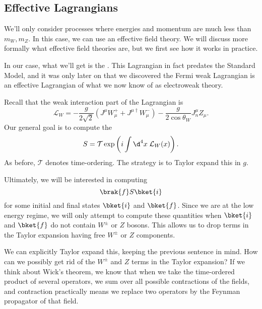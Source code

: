 \documentclass[a4paper]{article}
\begin{document}
\subsection{Effective Lagrangians}
We'll only consider processes where energies and momentum are much less than $m_W, m_Z$. In this case, we can use an effective field theory. We will discuss more formally what effective field theories are, but we first see how it works in practice.

In our case, what we'll get is the . This Lagrangian in fact predates the Standard Model, and it was only later on that we discovered the Fermi weak Lagrangian is an effective Lagrangian of what we now know of as electroweak theory.

Recall that the weak interaction part of the Lagrangian is
\[
  \mathcal{L}_W = -\frac{g}{2\sqrt{2}}(J^\mu W^+_\mu + J^{\mu\dagger}W_\mu^-) - \frac{g}{2 \cos \theta_W} J_n^\mu Z_\mu.
\]
Our general goal is to compute the 
\[
  S = \mathcal{T} \exp\left(i \int \d^4 x\; \mathcal{L}_W(x)\right).
\]
As before, $\mathcal{T}$ denotes time-ordering. The strategy is to Taylor expand this in $g$.

Ultimately, we will be interested in computing
\[
  \brak{f} S\bket{i}
\]
for some initial and final states $\bket{i}$ and $\bket{f}$. Since we are at the low energy regime, we will only attempt to compute these quantities when $\bket{i}$ and $\bket{f}$ do not contain $W^{\pm}$ or $Z$ bosons. This allows us to drop terms in the Taylor expansion having free $W^{\pm}$ or $Z$ components.

We can explicitly Taylor expand this, keeping the previous sentence in mind. How can we possibly get rid of the $W^{\pm}$ and $Z$ terms in the Taylor expansion? If we think about Wick's theorem, we know that when we take the time-ordered product of several operators, we sum over all possible contractions of the fields, and contraction practically means we replace two operators by the Feynman propagator of that field.
\end{document}
